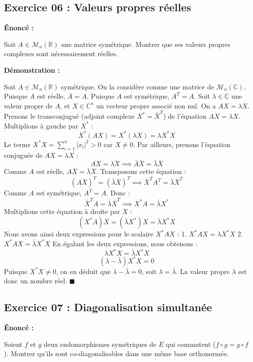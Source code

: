 \documentclass[11pt,a4paper]{article}
\begin{document}
\subsection*{Exercice 06 : Valeurs propres réelles}


\textbf{Énoncé :}


Soit $A \in \mathcal{M}_n(\mathbb{R})$ une matrice symétrique. Montrer que ses valeurs propres complexes sont nécessairement réelles.

\textbf{Démonstration :}


Soit $A \in \mathcal{M}_n(\mathbb{R})$ symétrique. On la considère comme une matrice de $\mathcal{M}_n(\mathbb{C})$.
Puisque $A$ est réelle, $\bar{A} = A$. Puisque $A$ est symétrique, $A^T = A$.
Soit $\lambda \in \mathbb{C}$ une valeur propre de $A$, et $X \in \mathbb{C}^n$ un vecteur propre associé non nul.
On a $A X = \lambda X$.
Prenons le transconjugué (adjoint complexe $X^* = \bar{X}^T$) de l'équation $AX = \lambda X$.
Multiplions à gauche par $X^*$ :
$$ X^* (A X) = X^* (\lambda X) = \lambda X^* X $$
Le terme $X^* X = \sum_{i=1}^n |x_i|^2 > 0$ car $X \neq 0$.
Par ailleurs, prenons l'équation conjuguée de $AX = \lambda X$ :
$$ \overline{A X} = \overline{\lambda X} \implies \bar{A} \bar{X} = \bar{\lambda} \bar{X} $$
Comme $A$ est réelle, $A \bar{X} = \bar{\lambda} \bar{X}$.
Transposons cette équation :
$$ (A \bar{X})^T = (\bar{\lambda} \bar{X})^T \implies \bar{X}^T A^T = \bar{\lambda} \bar{X}^T $$
Comme $A$ est symétrique, $A^T = A$. Donc :
$$ \bar{X}^T A = \bar{\lambda} \bar{X}^T \implies X^* A = \bar{\lambda} X^* $$
Multiplions cette équation à droite par $X$ :
$$ (X^* A) X = (\bar{\lambda} X^*) X = \bar{\lambda} X^* X $$
Nous avons ainsi deux expressions pour le scalaire $X^* A X$ :
1. $X^* A X = \lambda X^* X$
2. $X^* A X = \bar{\lambda} X^* X$
En égalant les deux expressions, nous obtenons :
$$ \lambda X^* X = \bar{\lambda} X^* X $$
$$ (\lambda - \bar{\lambda}) X^* X = 0 $$
Puisque $X^* X \neq 0$, on en déduit que $\lambda - \bar{\lambda} = 0$, soit $\lambda = \bar{\lambda}$.
La valeur propre $\lambda$ est donc un nombre réel. $\blacksquare$

\subsection*{Exercice 07 : Diagonalisation simultanée}


\textbf{Énoncé :}


Soient $f$ et $g$ deux endomorphismes symétriques de $E$ qui commutent ($f \circ g = g \circ f$). Montrer qu'ils sont co-diagonalisables dans une même base orthonormée.
\end{document}
